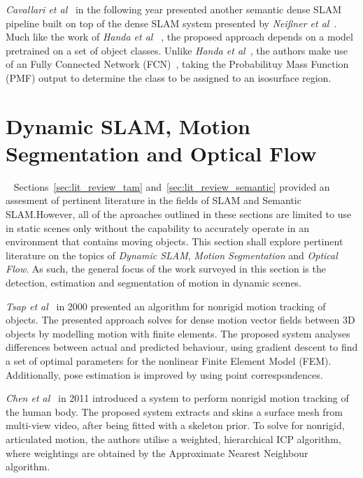 \textit{Cavallari et al}~\cite{Cavallari2016} in the following year presented another 
semantic dense SLAM pipeline built on top of the dense SLAM system presented by 
\textit{Nei{\ss}ner et al}~\cite{NieBner2013}. Much like the work of \textit{Handa et al} 
~\cite{Handa2015}, the proposed approach depends on a model pretrained on a set of object 
classes. Unlike \textit{Handa et al}~\cite{Handa2015}, the authors make use of an 
Fully Connected Network (FCN)~\cite{Long2015}, taking the Probabilituy Mass Function (PMF) 
output to determine the class to be assigned to an isosurface region.

\section{Dynamic SLAM, Motion Segmentation and Optical Flow}
~\label{sec:lit_review_dynamic}
Sections~\ref{sec:lit_review_tam} and~\ref{sec:lit_review_semantic} provided an assesment 
of pertinent literature in the fields of SLAM and Semantic SLAM.\@ However, all of the 
aproaches outlined in these sections are limited to use in static scenes only without 
the capability to accurately operate in an environment that contains moving objects. This 
section shall explore pertinent literature on the topics of \textit{Dynamic SLAM}, 
\textit{Motion Segmentation} and \textit{Optical Flow}. As such, the general focus of the 
work surveyed in this section is the detection, estimation and segmentation of motion in 
dynamic scenes.

\textit{Tsap et al}~\cite{Tsap2000} in 2000 presented an algorithm for nonrigid motion 
tracking of objects. The presented approach solves for dense motion vector fields between 
3D objects by modelling motion with finite elements. The proposed system analyses differences 
between actual and predicted behaviour, using gradient descent to find a set of optimal parameters 
for the nonlinear Finite Element Model (FEM). Additionally, pose estimation is improved by using point 
correspondences.

\textit{Chen et al}~\cite{Chen2011} in 2011 introduced a system to perform nonrigid motion 
tracking of the human body. The proposed system extracts and skins a surface mesh from 
multi-view video, after being fitted with a skeleton prior. To solve for nonrigid, articulated 
motion, the authors utilise a weighted, hierarchical ICP algorithm, where weightings are obtained 
by the Approximate Nearest Neighbour~\cite{Indyk2000} algorithm.

